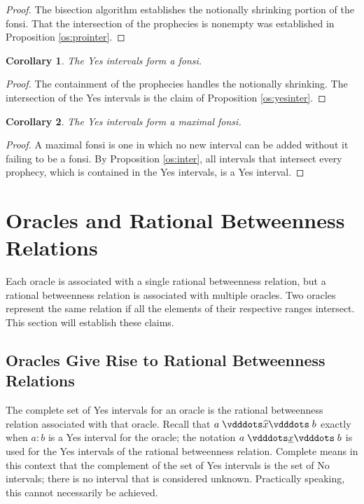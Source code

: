 \documentclass[12pt]{article}
\newtheorem{corollary}{Corollary}[section]
\begin{document}
\begin{proof}
    The bisection algorithm establishes the notionally shrinking portion of the fonsi. That the intersection of the prophecies is nonempty was established in Proposition \ref{os:prointer}.
\end{proof}


\begin{corollary}
    The Yes intervals form a fonsi. 
\end{corollary}

\begin{proof}
    The containment of the prophecies handles the notionally shrinking. The intersection of the Yes intervals is the claim of Proposition \ref{os:yesinter}.
\end{proof}


\begin{corollary}
    The Yes intervals form a maximal fonsi.
\end{corollary}

\begin{proof}
A maximal fonsi is one in which no new interval can be added without it failing to be a fonsi. By Proposition \ref{os:inter}, all intervals that intersect every prophecy, which is contained in the Yes intervals, is a Yes interval. 
\end{proof}




\section{Oracles and Rational Betweenness Relations}

Each oracle is associated with a single rational betweenness relation, but a rational betweenness relation is associated with multiple oracles. Two oracles represent the same relation if all the elements of their respective ranges intersect. This section will establish these claims. 

\subsection{Oracles Give Rise to Rational Betweenness Relations}

The complete set of Yes intervals for an oracle is the rational betweenness relation associated with that oracle. Recall that $a \xora b$ exactly when $a:b$ is a Yes interval for the oracle; the notation $a \xrel b$ is used for the Yes intervals of the rational betweenness relation. Complete means in this context that the complement of the set of Yes intervals is the set of No intervals; there is no interval that is considered unknown. Practically speaking, this cannot necessarily be achieved.
\end{document}
